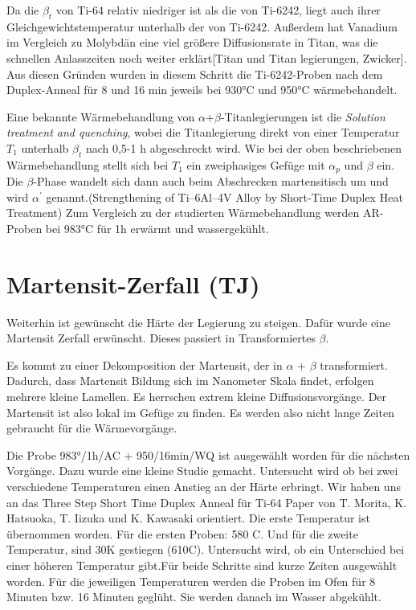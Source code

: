 Da die $\beta_{t}$ von Ti-64 relativ niedriger ist als die von Ti-6242, liegt auch ihrer Gleichgewichtstemperatur unterhalb der von Ti-6242. Außerdem hat Vanadium im Vergleich zu Molybdän eine viel größere Diffusionsrate in Titan, was die schnellen Anlasszeiten noch weiter erklärt[Titan und Titan legierungen, Zwicker]. Aus diesen Gründen wurden in diesem Schritt die Ti-6242-Proben nach dem Duplex-Anneal für 8 und 16 min jeweils bei 930°C und 950°C wärmebehandelt.

Eine bekannte Wärmebehandlung von $\alpha$+$\beta$-Titanlegierungen ist die  \textit{Solution treatment and quenching}, wobei die Titanlegierung direkt von einer Temperatur $T_{1}$ unterhalb  $\beta_{t}$ nach 0,5-1 h abgeschreckt wird. Wie bei der oben beschriebenen Wärmebehandlung stellt sich bei $T_{1}$ ein zweiphasiges Gefüge mit $\alpha_p$ und $\beta$ ein. Die $\beta$-Phase wandelt sich  dann auch beim Abschrecken martensitisch um und wird $\alpha^\prime$ genannt.(Strengthening of Ti–6Al–4V Alloy by Short-Time Duplex Heat Treatment)
Zum Vergleich zu der studierten Wärmebehandlung werden AR-Proben bei 983°C für 1h erwärmt und wassergekühlt.

\section{Martensit-Zerfall (TJ)}

Weiterhin ist gewünscht die Härte der Legierung zu steigen. Dafür wurde eine Martensit Zerfall erwünscht. Dieses passiert in Transformiertes $\beta$. 

Es kommt zu einer Dekomposition der Martensit, der in $\alpha$ + $\beta$ transformiert. Dadurch, dass Martensit Bildung sich im Nanometer Skala findet, erfolgen mehrere kleine Lamellen. Es herrschen extrem kleine Diffusionsvorgänge. Der Martensit ist also lokal im Gefüge zu finden. Es werden also nicht lange Zeiten gebraucht für die Wärmevorgänge.

Die Probe 983°/1h/AC + 950/16min/WQ ist ausgewählt worden für die nächsten Vorgänge. Dazu wurde eine kleine Studie gemacht. Untersucht wird ob bei zwei verschiedene Temperaturen einen Anstieg an der Härte erbringt. Wir haben uns an das Three Step Short Time Duplex Anneal für Ti-64 Paper von T. Morita, K. Hatsuoka, T. Iizuka und K. Kawasaki orientiert. Die erste Temperatur ist übernommen worden. Für die ersten Proben: 580 C. Und für die zweite Temperatur, sind 30K gestiegen (610C). Untersucht wird, ob ein Unterschied bei einer höheren Temperatur gibt.Für beide Schritte sind kurze Zeiten ausgewählt worden. Für die jeweiligen Temperaturen werden die Proben im Ofen für 8 Minuten bzw. 16 Minuten geglüht. Sie werden danach im Wasser abgekühlt. 

